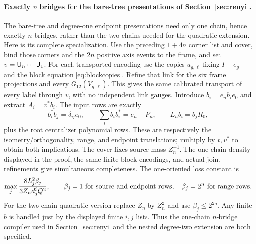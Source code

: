 \paragraph{Exactly $n$ bridges for the bare-tree presentations of Section~\ref{sec:renyi}.}
The bare-tree and degree-one endpoint presentations need only one
chain, hence exactly $n$ bridges, rather than the two chains needed
for the quadratic extension. Here is its complete specialization.
Use the preceding $1+4n$ corner list and cover, bind those corners and
the $2n$ positive axis events to the frame, and set
$v={\mathsf U}_n\cdots {\mathsf U}_1$. For each transported encoding use the
copies $u_{g,\ell}$ fixing $I-e_g$ and the block equation
\eqref{eq:blockcopies}. Refine that link for the six frame projections and every
$G_{12}(V_{g,\ell})$. This gives the same calibrated transport of every
label through $v$, with no independent link gauges. Introduce
$b_i=e_nb_ie_0$ and extract $A_i=v^*b_i$. The input rows are exactly
\[
 b_i^*b_j=\delta_{ij}e_0,\qquad
 \sum_i b_ib_i^*=e_n-P_n,\qquad L_nb_i=b_jR_0,
\]
plus the root centralizer polynomial rows. These are respectively
the isometry/orthogonality, range, and endpoint translations; multiply
by $v,v^*$ to obtain both implications. The cover fixes source mass
$Z_n^{-1}$. The one-chain density displayed in the proof, the same
finite-block encodings, and actual joint refinements give simultaneous
completeness. The one-oriented loss constant is
\[
 \max_j\frac{8L_j^2\beta_j}{3Z_nd_j^3Q^2},\qquad
 \beta_j=1\ \hbox{for source and endpoint rows},\quad
 \beta_j=2^n\ \hbox{for range rows}.
\]
For the two-chain quadratic version replace $Z_n$ by $Z_n^2$ and use
$\beta_j\le2^{2n}$. Any finite $b$ is handled just by the displayed
finite $i,j$ lists. Thus the one-chain $n$-bridge compiler used in Section~\ref{sec:renyi} and the nested degree-two extension are both specified.

